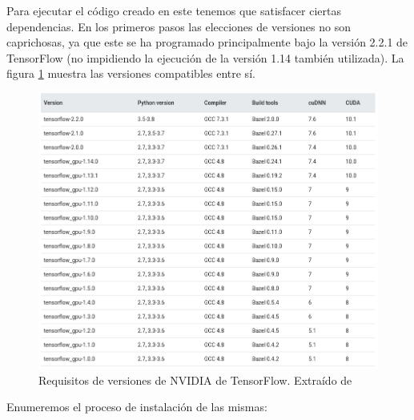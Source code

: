 \documentclass[../main.tex]{subfiles}
\begin{document}
Para ejecutar el código creado en este \tfg tenemos que satisfacer ciertas dependencias. En los primeros pasos las elecciones de versiones no son caprichosas, ya que este \tfg se ha programado principalmente bajo la versión 2.2.1 de TensorFlow (no impidiendo la ejecución de la versión 1.14 también utilizada). La figura \ref{fig:cuadro_versiones_tensorflow_cuda} muestra las versiones compatibles entre sí.

\begin{figure}[h!]
    \centering
    \includegraphics[width=1\textwidth]{imagenes/cuadro_versiones_tensorflow_cuda.png}
    \caption[Requisitos de versiones de NVIDIA de TensorFlow]{Requisitos de versiones de NVIDIA de TensorFlow. Extraído de \cite{StackOverflow2018}}
    \label{fig:cuadro_versiones_tensorflow_cuda}
\end{figure}

Enumeremos el proceso de instalación de las mismas:
\end{document}
